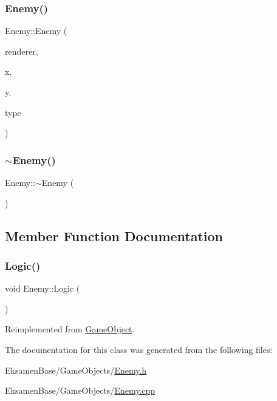 \subsubsection{\texorpdfstring{Enemy()}{Enemy()}}
{\footnotesize\ttfamily Enemy\+::\+Enemy (\begin{DoxyParamCaption}\item[{S\+D\+L\+\_\+\+Renderer $\ast$}]{renderer,  }\item[{int}]{x,  }\item[{int}]{y,  }\item[{\mbox{\hyperlink{class_enemy_ae6c971b1c4da1335dfd6542dea6efecb}{E\+N\+E\+M\+Y\+\_\+\+T\+Y\+PE}}}]{type }\end{DoxyParamCaption})}

\mbox{\label{class_enemy_ac0eec4755e28c02688065f9657150ac3}} 
\subsubsection{\texorpdfstring{$\sim$\+Enemy()}{~Enemy()}}
{\footnotesize\ttfamily Enemy\+::$\sim$\+Enemy (\begin{DoxyParamCaption}{ }\end{DoxyParamCaption})}



\subsection{Member Function Documentation}
\mbox{\label{class_enemy_adcde768475970dae1e4c3e76fb59bc46}} 
\subsubsection{\texorpdfstring{Logic()}{Logic()}}
{\footnotesize\ttfamily void Enemy\+::\+Logic (\begin{DoxyParamCaption}{ }\end{DoxyParamCaption})\hspace{0.3cm}{\ttfamily [virtual]}}



Reimplemented from \mbox{\hyperlink{class_game_object_a79510ffc77339fe850491dce9f580fa9}{Game\+Object}}.



The documentation for this class was generated from the following files\+:\begin{DoxyCompactItemize}
\item 
Eksamen\+Base/\+Game\+Objects/\mbox{\hyperlink{_enemy_8h}{Enemy.\+h}}\item 
Eksamen\+Base/\+Game\+Objects/\mbox{\hyperlink{_enemy_8cpp}{Enemy.\+cpp}}\end{DoxyCompactItemize}
